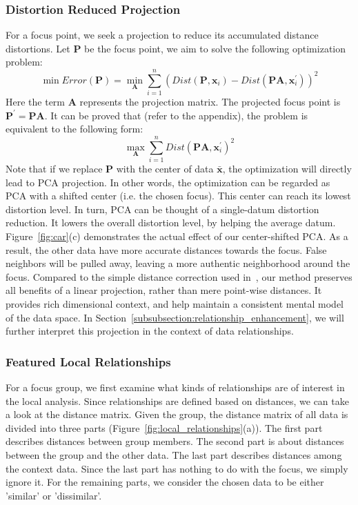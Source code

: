 \subsubsection{Distortion Reduced Projection}
For a focus point, we seek a projection to reduce its accumulated distance distortions. Let $\mathbf{P}$ be the focus point, we aim to solve the following optimization problem:
\begin{equation}
\min Error(\mathbf{P}) = \min_{\mathbf{A}}  \sum\limits_{i=1}^{n}(Dist(\mathbf{P}, \mathbf{x}_{i}) - Dist(\mathbf{PA}, \mathbf{x}_{i}^{\prime}))^{2}
\end{equation}
Here the term $\mathbf{A}$ represents the projection matrix. The projected focus point is $\mathbf{P^{\prime}} = \mathbf{PA}$. It can be proved that (refer to the appendix), the problem is equivalent to the following form:
\begin{equation}
\label{equation:center-shiftedPCA}
\max_{\mathbf{A}}  \sum\limits_{i=1}^{n}Dist(\mathbf{PA}, \mathbf{x}_{i}^{\prime})^{2}
\end{equation}
Note that if we replace $\mathbf{P}$ with the center of data $\mathbf{\bar{x}}$, the optimization will directly lead to PCA projection. In other words, the optimization can be regarded as PCA with a shifted center (i.e. the chosen focus). This center can reach its lowest distortion level. In turn, PCA can be thought of a single-datum distortion reduction. It lowers the overall distortion level, by helping the average datum. Figure~\ref{fig:car}(c) demonstrates the actual effect of our center-shifted PCA. As a result, the other data have more accurate distances towards the focus. False neighbors will be pulled away, leaving a more authentic neighborhood around the focus. Compared to the simple distance correction used in~\cite{DBLP:journals/tvcg/StahnkeDMT16}, our method preserves all benefits of a linear projection, rather than mere point-wise distances. It provides rich dimensional context, and help maintain a consistent mental model of the data space. In Section~\ref{subsubsection:relationship_enhancement}, we will further interpret this projection in the context of data relationships.

\subsubsection{Featured Local Relationships}
For a focus group, we first examine what kinds of relationships are of interest in the local analysis. Since relationships are defined based on distances, we can take a look at the distance matrix. Given the group, the distance matrix of all data is divided into three parts (Figure~\ref{fig:local_relationships}(a)). The first part describes distances between group members. The second part is about distances between the group and the other data. The last part describes distances among the context data. Since the last part has nothing to do with the focus, we simply ignore it. For the remaining parts, we consider the chosen data to be either 'similar' or 'dissimilar'.

